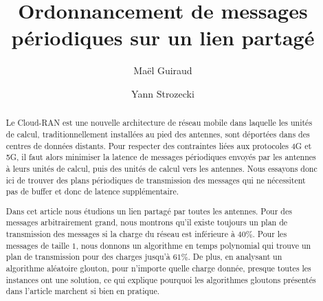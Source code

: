 \documentclass[10pt, conference, letterpaper]{algotel}
\author{Maël Guiraud\addressmark{1,2}
  \and Yann Strozecki\addressmark{1}}
\title{Ordonnancement de messages périodiques sur un lien partagé}
\begin{document}
\maketitle

\begin{abstract}
Le Cloud-RAN est une nouvelle architecture de réseau mobile dans laquelle les unités de calcul, traditionnellement installées au pied des antennes, sont déportées dans des centres de données distants. Pour respecter des contraintes liées aux protocoles 4G et 5G, il faut alors minimiser la latence de messages périodiques envoyés par les antennes
à leurs unités de calcul, puis des unités de calcul vers les antennes. Nous essayons donc ici de trouver des plans périodiques de transmission des messages qui ne nécessitent pas de buffer et donc de latence supplémentaire.

Dans cet article nous étudions un lien partagé par toutes les antennes. Pour des messages arbitrairement grand, nous montrons qu'il existe toujours un plan de transmission des messages si la charge du réseau est inférieure à $40\%$.  Pour les messages de taille $1$, nous donnons un algorithme en temps polynomial qui trouve un plan de transmission pour des charges jusqu'à $61\%$. De plus, en analysant un algorithme aléatoire glouton, pour n'importe quelle charge donnée, presque toutes les instances ont une solution, ce qui explique pourquoi les algorithmes gloutons présentés dans l'article marchent si bien en pratique.
\end{abstract}




\end{document}
